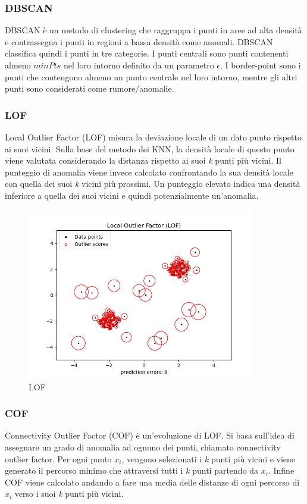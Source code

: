 \subsubsection{DBSCAN}
DBSCAN è un metodo di clustering che raggruppa i punti in aree ad alta densità e contrassegna i punti in regioni a bassa densità come anomali.
DBSCAN classifica quindi i punti in tre categorie. I punti centrali sono punti
contenenti almeno $minPts$ nel loro intorno definito da un parametro $\epsilon$. I border-point sono i punti che contengono almeno un punto centrale nel loro intorno, mentre gli altri punti sono considerati come rumore/anomalie. 


\subsubsection{LOF}
Local Outlier Factor (LOF) \cite{breunig2000lof} misura la deviazione locale di un dato punto rispetto ai suoi vicini. Sulla base del metodo dei KNN, la densità locale di questo punto viene valutata considerando la distanza rispetto ai suoi \textit{k} punti più vicini. Il punteggio di anomalia viene invece calcolato confrontando la sua densità locale con quella dei suoi \textit{k} vicini più prossimi. Un punteggio elevato indica una densità inferiore a quella dei suoi vicini e quindi potenzialmente un'anomalia.
\begin{figure}[t]
	\centering
	\includegraphics[width=10cm, scale=1]{images/lof}
	\caption{LOF}
	\label{lof}
\end{figure}

\subsubsection{COF}
Connectivity Outlier Factor (COF) \cite{tang2002enhancing} è un'evoluzione di LOF. Si basa sull'idea di assegnare un grado di anomalia ad ognuno dei punti, chiamato connectivity outlier factor.
Per ogni punto $x_i$, vengono selezionati i \textit{k} punti più vicini e viene generato il percorso minimo che attraversi tutti i \textit{k} punti partendo da $x_i$. Infine COF viene calcolato andando a fare una media delle distanze di ogni percorso di $x_i$ verso i suoi \textit{k} punti più vicini.

